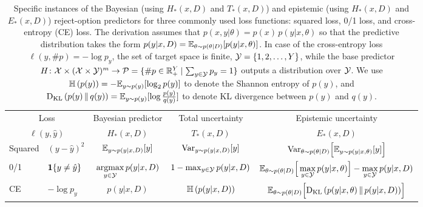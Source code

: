 \begin{table}[]
    \centering
    \begin{tabular}{ll|c|c|c}
          \multicolumn{2}{c|}{Loss}& Bayesian predictor & Total uncertainty & Epistemic uncertainty\\
          \multicolumn{2}{c|}{$\ell(y,\hat{y})$} & $H_*(x,D)$        & $T_*(x,D)$          & $E_*(x,D)$ \\
       \hline%
       \hline
       Squared & $(y-\hat{y})^2$ &
       ${\mathbb{E}}_{y\sim p(y|x,D)}[y] $  &
       ${\rm Var}_{y\sim p(y|x,D)} [y]$&
       ${\rm Var}_{\theta\sim p(\theta|D)} \Big [ {\mathbb{E}}_{y\sim p(y|x,\theta)}[y] \Big ]$\\
       \hline
       0/1 & $\mathbf{1}{\{ { y\neq \hat{y}}\}}$ & 
       $\mathop{\rm argmax}\limits_{y\in{\cal Y}} p(y|x,D)$  &
       $1-\max_{y\in{\cal Y}} p(y|x,D)$ &
       ${\mathbb{E}}_{\theta\sim p(\theta|D)}\Big[ \max\limits_{y\in{\cal Y}} p(y|x,\theta)\Big ] - \max\limits_{y\in{\cal Y}} p(y|x,D)$ \\
       \hline
       CE & $-\log p_y$ & $p(y|x,D)$ & ${\mathbb{H}\left ( {p(y|x,D)} \right ) }$ &
       ${\mathbb{E}}_{\theta\sim p(\theta|D)} \Big [ {{\rm D}_{\rm KL}\left ( { p(y|x,\theta)\, \|\, p(y|x,D)}\right )} \Big ]$ \\       
    \end{tabular}
    \caption{Specific instances of the Bayesian (using $H_*(x,D)$ and $T_*(x,D)$) and epistemic (using $H_*(x,D)$ and $E_*(x,D)$) reject-option predictors for three commonly used loss functions: squared loss, 0/1 loss, and cross-entropy (CE) loss. The derivation assumes that $p(x,y|\theta)=p(x)\,p(y|x,\theta)$ so that the predictive distribution takes the form $p(y|x,D)={\mathbb{E}}_{\theta\sim p(\theta|D)}[p(y|x,\theta)]$.
    In case of the cross-entropy loss $\ell(y,\#p)=-\log p_y$, the set of target space is finite, ${\cal Y}=\{1,2,\ldots,Y\}$, while the base predictor $H\colon{\cal X}\times({\cal X}\times{\cal Y})^m\rightarrow{\cal P}=\{\#p\in\mathbb{R}_+^Y\mid \sum_{y\in{\cal Y}}p_y=1\}$ outputs a distribution over ${\cal Y}$. We use ${\mathbb{H}\left ( {p(y)} \right ) } = -\mathbb{E}_{y \sim p(y)}[\log_2 p(y)]$ to denote the Shannon entropy of $p(y)$, and ${{\rm D}_{\rm KL}\left ( { p(y)\, \|\, q(y)}\right )}={\mathbb{E}}_{y\sim p(y)} [ \log \frac{p(y)}{q(y)}]$ to denote KL divergence between $p(y)$ and $q(y)$.}
    \label{tab:Summary}
    \vspace{-0.65cm}
\end{table}
